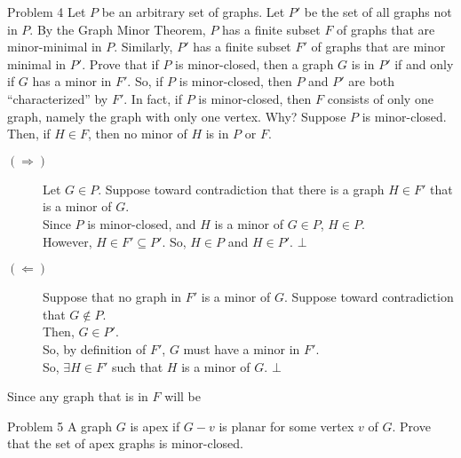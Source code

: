 \documentclass[8pt]{extarticle}
\begin{document}
  \begin{problem}{Problem 4}
    Let $P$ be an arbitrary set of graphs. Let $P'$ be the set of all graphs not in $P$. By the Graph Minor Theorem, $P$ has a finite subset $F$ of graphs that are minor-minimal in $P$. Similarly, $P'$ has a finite subset $F'$ of graphs that are minor minimal in $P'$. Prove that if $P$ is minor-closed, then a graph $G$ is in $P'$ if and only if $G$ has a minor in $F'$. So, if $P$ is minor-closed, then $P$ and $P'$ are both ``characterized'' by $F'$. In fact, if $P$ is minor-closed, then $F$ consists of only one graph, namely the graph with only one vertex. Why?
    \tcblower
    Suppose $P$ is minor-closed. Then, if $H\in F$, then no minor of $H$ is in $P$ or $F$. 
    \begin{description}
      \item[$(\Rightarrow)$] Let $G\in P$. Suppose toward contradiction that there is a graph $H\in F'$ that is a minor of $G$.\\

        Since $P$ is minor-closed, and $H$ is a minor of $G\in P$, $H\in P$.\\

        However, $H\in F'\subseteq P'$. So, $H\in P$ and $H\in P'$. $\bot$
      \item[$(\Leftarrow)$] Suppose that no graph in $F'$ is a minor of $G$. Suppose toward contradiction that $G \notin P$.\\

        Then, $G\in P'$.\\

        So, by definition of $F'$, $G$ must have a minor in $F'$.\\

        So, $\exists H\in F'$ such that $H$ is a minor of $G$. $\bot$
    \end{description}
    Since any graph that is in $F$ will be 
  \end{problem}
  \begin{problem}{Problem 5}
    A graph $G$ is apex if $G-v$ is planar for some vertex $v$ of $G$. Prove that the set of apex graphs is minor-closed.
  \end{problem}
\end{document}
